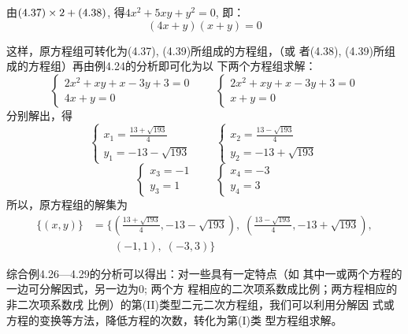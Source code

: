 \begin{solution}
    由$(4.37)\times2+(4.38)$, 得$4x^2+5xy+y^2=0$,  即：
\begin{equation}
    (4x+y)(x+y)=0
\end{equation}

这样，原方程组可转化为(4.37), (4.39)所组成的方程组，（或
者(4.38), (4.39)所组成的方程组）再由例4.24的分析即可化为以
下两个方程组求解：
\[\begin{cases}
    2x^2+xy+x-3y+3=0\\
4x+y=0
\end{cases}\qquad \begin{cases}
    2x^2+xy+x-3y+3=0\\
x+y=0
\end{cases}\]
分别解出，得
\[\begin{cases}
    x_1=\frac{13+\sqrt{193}}{4} \\ y_1=-13-\sqrt{193}
\end{cases}\qquad \begin{cases}
    x_2=\frac{13-\sqrt{193}}{4} \\ y_2=-13+\sqrt{193}
\end{cases}\]
\[\begin{cases}
    x_3=-1\\y_3=1
\end{cases}\qquad \begin{cases}
    x_4=-3\\ y_4=3
\end{cases}\]
所以，原方程组的解集为
\[\begin{split}
    \{(x,y)\}&=\Bigg\{\left(\frac{13+\sqrt{193}}{4}, -13-\sqrt{193}\right),\; \left(\frac{13-\sqrt{193}}{4}, -13+\sqrt{193}\right),\\
    &\qquad  (-1,1),\; (-3,3)\Bigg\}
\end{split}
\]

\end{solution}

综合例4.26---4.29的分析可以得出：对一些具有一定特点（如
其中一或两个方程的一边可分解因式，另一边为0; 两个方
程相应的二次项系数成比例；两方程相应的非二次项系数戌
比例）的第(II)类型二元二次方程组，我们可以利用分解因
式或方程的变换等方法，降低方程的次数，转化为第(I)类
型方程组求解。

